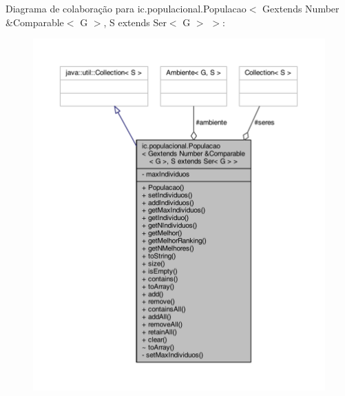 Diagrama de colaboração para ic.\-populacional.\-Populacao$<$ Gextends Number \&Comparable$<$ G $>$, S extends Ser$<$ G $>$ $>$\-:
\nopagebreak
\begin{figure}[H]
\begin{center}
\leavevmode
\includegraphics[width=350pt]{classic_1_1populacional_1_1_populacao_3_01_gextends_01_number_01_6_comparable_3_01_g_01_4_00_01_89a00253e6784d9a9b939e7aa7711ce5}
\end{center}
\end{figure}
